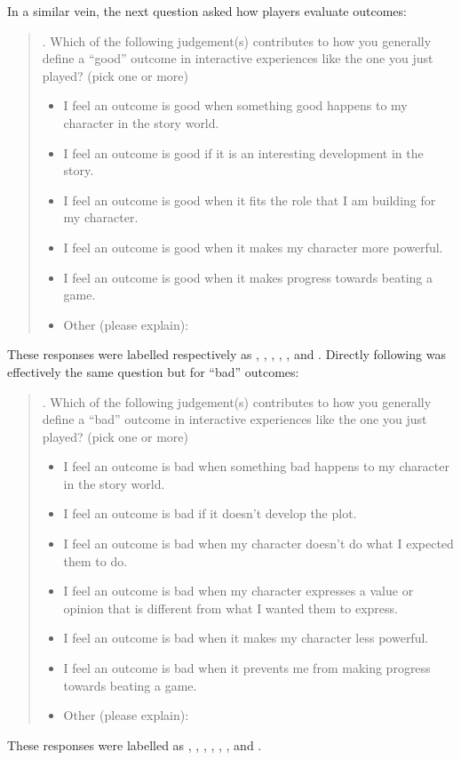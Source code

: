 In a similar vein, the next question asked how players evaluate outcomes:
%
\begin{quote}
  . Which of the following judgement(s) contributes to how you generally define a ``good'' outcome in interactive experiences like the one you just played? (pick one or more) \\
  \begin{itemize}
    \item[\ding{111}] I feel an outcome is good when something good happens to my character in the story world.
    \item[\ding{111}] I feel an outcome is good if it is an interesting development in the story.
    \item[\ding{111}] I feel an outcome is good when it fits the role that I am building for my character.
    \item[\ding{111}] I feel an outcome is good when it makes my character more powerful.
    \item[\ding{111}] I feel an outcome is good when it makes progress towards beating a game.
    \item[\ding{111}] Other (please explain):
  \end{itemize}
\end{quote}
%
These responses were labelled respectively as , , , , , and .
%
Directly following was effectively the same question but for ``bad'' outcomes:
%
\begin{quote}
  . Which of the following judgement(s) contributes to how you generally define a ``bad'' outcome in interactive experiences like the one you just played? (pick one or more)
  \begin{itemize}
    \item[\ding{111}] I feel an outcome is bad when something bad happens to my character in the story world.
    \item[\ding{111}] I feel an outcome is bad if it doesn't develop the plot.
    \item[\ding{111}] I feel an outcome is bad when my character doesn't do what I expected them to do.
    \item[\ding{111}] I feel an outcome is bad when my character expresses a value or opinion that is different from what I wanted them to express.
    \item[\ding{111}] I feel an outcome is bad when it makes my character less powerful.
    \item[\ding{111}] I feel an outcome is bad when it prevents me from making progress towards beating a game.
    \item[\ding{111}] Other (please explain):
  \end{itemize}
\end{quote}
%
These responses were labelled as , , , , , , and .

